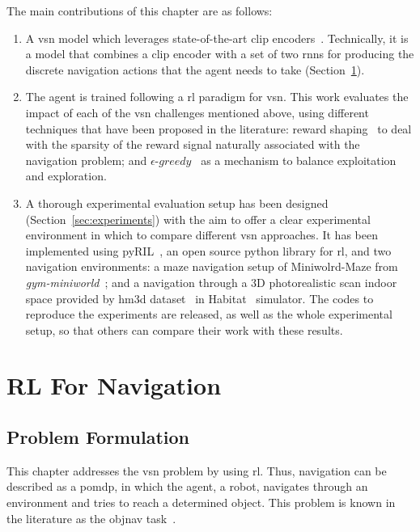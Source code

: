 The main contributions of this chapter are as follows:
\begin{enumerate}
    \item A \acrshort{vsn} model which leverages state-of-the-art \acrfull{clip} encoders~\cite{radford2021}.
    Technically, it is a model that combines a \acrshort{clip} encoder with a set of two \acrshort{rnn}s for producing the discrete navigation actions that the agent needs to take (Section~\ref{sec:navigation}).
    \item The agent is trained following a \acrshort{rl} paradigm for \acrshort{vsn}.
    This work evaluates the impact of each of the \acrshort{vsn} challenges mentioned above, using different techniques that have been proposed in the literature: reward shaping~\cite{sutton2018, wijmans2020} to deal with the sparsity of the reward signal naturally associated with the navigation problem; and $\epsilon\text{-}greedy$~\cite{mnih2013} as a mechanism to balance exploitation and exploration.
    \item A thorough experimental evaluation setup has been designed (Section~\ref{sec:experiments}) with the aim to offer a clear experimental environment in which to compare different \acrshort{vsn} approaches.
    It has been implemented using pyRIL~\cite{pyRIL}, an open source python library for \acrshort{rl}, and two navigation environments: a maze navigation setup of Miniwolrd-Maze from \textit{gym-miniworld}~\cite{gym_miniworld}; and a navigation through a 3D photorealistic scan indoor space provided by \acrfull{hm3d} dataset~\cite{ramakrishnan2021} in Habitat~\cite{szot2021} simulator.
    The codes to reproduce the experiments are released, as well as the whole experimental setup, so that others can compare their work with these results.
\end{enumerate}


\section{RL For Navigation}\label{sec:navigation}

\subsection{Problem Formulation}\label{subsec:problem-formulation}

This chapter addresses the \acrshort{vsn} problem by using \acrshort{rl}.
Thus, navigation can be described as a \acrfull{pomdp}, in which the agent, \ie a robot, navigates through an environment and tries to reach a determined object.
This problem is known in the literature as the \acrfull{objnav} task~\cite{batra2020}.

